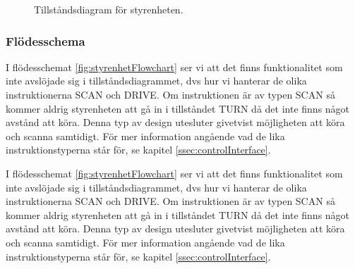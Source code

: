 \documentclass[a4paper,11pt]{article}
\begin{document}
\begin{figure}[h!]
	\caption{Tillståndsdiagram för styrenheten.}
	\label{fig:stateDiagram}
\end{figure}

\subsubsection{Flödesschema}
I flödesschemat \ref{fig:styrenhetFlowchart} ser vi att det finns funktionalitet som inte avslöjade sig i tillståndsdiagrammet, dvs hur vi hanterar de olika instruktionerna SCAN och DRIVE. Om instruktionen är av typen SCAN så kommer aldrig styrenheten att gå in i tillståndet TURN då det inte finns något avstånd att köra. Denna typ av design utesluter givetvist möjligheten att köra och scanna samtidigt. För mer information angående vad de lika instruktionstyperna står för, se kapitel \ref{ssec:controlInterface}.  

I flödesschemat \ref{fig:styrenhetFlowchart} ser vi att det finns funktionalitet som inte avslöjade sig i tillståndsdiagrammet, dvs hur vi hanterar de olika instruktionerna SCAN och DRIVE. Om instruktionen är av typen SCAN så kommer aldrig styrenheten att gå in i tillståndet TURN då det inte finns något avstånd att köra. Denna typ av design utesluter givetvist möjligheten att köra och scanna samtidigt. För mer information angående vad de lika instruktionstyperna står för, se kapitel \ref{ssec:controlInterface}. 
\end{document}
